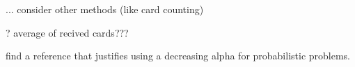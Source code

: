 







... consider other methods (like card counting)

? average of recived cards???

find a reference that justifies using a decreasing alpha for probabilistic problems. 
